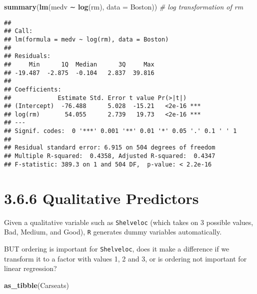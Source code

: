 \documentclass[]{article}
\newenvironment{Shaded}{\begin{snugshade}}{\end{snugshade}}
\newcommand{\CommentTok}[1]{\textcolor[rgb]{0.56,0.35,0.01}{\textit{#1}}}
\newcommand{\DataTypeTok}[1]{\textcolor[rgb]{0.13,0.29,0.53}{#1}}
\newcommand{\KeywordTok}[1]{\textcolor[rgb]{0.13,0.29,0.53}{\textbf{#1}}}
\newcommand{\NormalTok}[1]{#1}
\begin{document}
\begin{Shaded}
\begin{Highlighting}[]
\KeywordTok{summary}\NormalTok{(}\KeywordTok{lm}\NormalTok{(medv ∼ }\KeywordTok{log}\NormalTok{(rm), }\DataTypeTok{data =}\NormalTok{ Boston)) }\CommentTok{# log transformation of rm}
\end{Highlighting}
\end{Shaded}

\begin{verbatim}
## 
## Call:
## lm(formula = medv ~ log(rm), data = Boston)
## 
## Residuals:
##     Min      1Q  Median      3Q     Max 
## -19.487  -2.875  -0.104   2.837  39.816 
## 
## Coefficients:
##             Estimate Std. Error t value Pr(>|t|)    
## (Intercept)  -76.488      5.028  -15.21   <2e-16 ***
## log(rm)       54.055      2.739   19.73   <2e-16 ***
## ---
## Signif. codes:  0 '***' 0.001 '**' 0.01 '*' 0.05 '.' 0.1 ' ' 1
## 
## Residual standard error: 6.915 on 504 degrees of freedom
## Multiple R-squared:  0.4358, Adjusted R-squared:  0.4347 
## F-statistic: 389.3 on 1 and 504 DF,  p-value: < 2.2e-16
\end{verbatim}

\hypertarget{qualitative-predictors}{%
\section{3.6.6 Qualitative Predictors}\label{qualitative-predictors}}

Given a qualitative variable such as \texttt{Shelveloc} (which takes on
3 possible values, Bad, Medium, and Good), \texttt{R} generates dummy
variables automatically.

BUT ordering is important for \texttt{Shelveloc}, does it make a
difference if we transform it to a factor with values 1, 2 and 3, or is
ordering not important for linear regression?

\begin{Shaded}
\begin{Highlighting}[]
\KeywordTok{as_tibble}\NormalTok{(Carseats)}
\end{Highlighting}
\end{Shaded}
\end{document}
